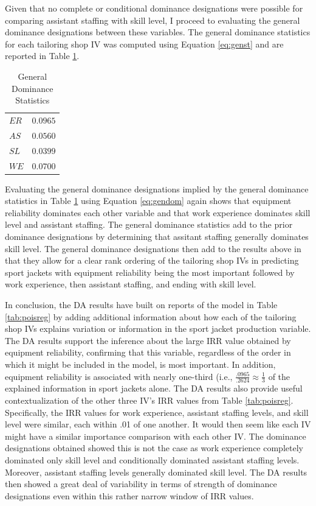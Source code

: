 \documentclass[ShortAfour,times,sageapa]{sagej}
\begin{document}
	Given that no complete or conditional dominance designations were possible for comparing assistant staffing with skill level, I proceed to evaluating the general dominance designations between these variables. 
	The general dominance statistics for each tailoring shop IV was computed using Equation \ref{eq:genst} and are reported in Table \ref{tab:gen}.
	
	\begin{table}[h!]
		\centering
		\caption{\centering General Dominance Statistics}
		\begin{tabular}{l|r}
			\toprule
			$ER$ & $0.0965$ \\ 
			$AS$ & $0.0560$ \\ 
			$SL$ & $0.0399$ \\ 
			$WE$ & $0.0700$ \\ 
			\bottomrule
		\end{tabular}
		\label{tab:gen}
	\end{table}

	Evaluating the general dominance designations implied by the general dominance statistics in Table \ref{tab:gen} using Equation \ref{eq:gendom} again shows that equipment reliability dominates each other variable and that work experience dominates skill level and assistant staffing. 
	The general dominance statistics add to the prior dominance designations by determining that assitant staffing generally dominates skill level.
	The general dominance designations then add to the results above in that they allow for a clear rank ordering of the tailoring shop IVs in predicting sport jackets with equipment reliability being the most important followed by work experience, then assistant staffing, and ending with skill level.
	
	In conclusion, the DA results have built on reports of the model in Table \ref{tab:poisreg} by adding additional information about how each of the tailoring shop IVs explains variation or information in the sport jacket production variable. 
	The DA results support the inference about the large IRR value obtained by equipment reliability, confirming that this variable, regardless of the order in which it might be included in the model, is most important. 
	In addition, equipment reliability is associated with nearly one-third (i.e., $\frac{.0965}{.2624} \approx \frac{1}{3}$ of the explained information in sport jackets alone.
	The DA results also provide useful contextualization of the other three IV's IRR values from Table \ref{tab:poisreg}.
	Specifically, the IRR values for work experience, assistant staffing levels, and skill level were similar, each within .01 of one another. 
	It would then seem like each IV might have a similar importance comparison with each other IV.
	The dominance designations obtained showed this is not the case as work experience completely dominated only skill level and conditionally dominated assistant staffing levels. 
	Moreover, assistant staffing levels generally dominated skill level.
	The DA results then showed a great deal of variability in terms of strength of dominance designations even within this rather narrow window of IRR values.
\end{document}
